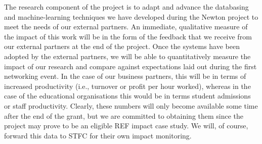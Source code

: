 \documentclass[11pt]{article}
\begin{document}
  \vspace{2mm}
  \noindent
  The research component of the project is to adapt and advance the databasing and machine-learning techniques we have developed during the Newton project to meet the needs of our external partners. An immediate, qualitative measure of the impact of this work will be in the form of the feedback that we receive from our external partners at the end of the project. Once the systems have been adopted by the external partners, we will be able to quantitatively measure the impact of our research and compare against expectations laid out during the first networking event. In the case of our business partners, this will be in terms of increased productivity (i.e., turnover or profit per hour worked), whereas in the case of the educational organisations this would be in terms student admissions or staff productivity. Clearly, these numbers will only become available some time after the end of the grant, but we are committed to obtaining them since the project may prove to be an eligible REF impact case study. We will, of course, forward this data to STFC for their own impact monitoring.
  
  
\end{document}
